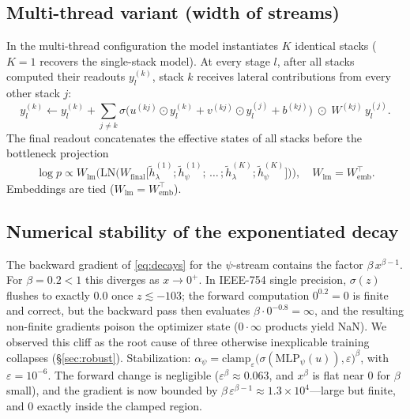 \documentclass[11pt]{article}
\begin{document}
\subsection{Multi-thread variant (width of streams)}\label{sec:threads}
In the multi-thread configuration the model instantiates $K$ identical
stacks ($K=1$ recovers the single-stack model). At every stage $l$, after
all stacks computed their readouts $y_l^{(k)}$, stack $k$ receives lateral
contributions from every other stack $j$:
\begin{equation}\label{eq:lateral}
y_l^{(k)} \leftarrow y_l^{(k)} + \sum_{j \ne k}
\sigma\big(u^{(kj)} \odot y_l^{(k)} + v^{(kj)} \odot y_l^{(j)} + b^{(kj)}\big)
\;\odot\; W^{(kj)}\, y_l^{(j)}.
\end{equation}
The final readout concatenates the effective states of all stacks before the
bottleneck projection
\begin{equation}\label{eq:head}
\log p \propto W_{\mathrm{lm}}\Big( \mathrm{LN}\Big(
W_{\mathrm{final}} \big[ \widetilde h_{\lambda}^{(1)}; \widetilde h_{\psi}^{(1)};
\,\dots\, ; \widetilde h_{\lambda}^{(K)}; \widetilde h_{\psi}^{(K)} \big]
\Big)\Big), \quad W_{\mathrm{lm}} = W_{\mathrm{emb}}^\top.
\end{equation}
Embeddings are tied ($W_{\mathrm{lm}} = W_{\mathrm{emb}}^\top$).

\subsection{Numerical stability of the exponentiated decay}\label{sec:stability}
The backward gradient of \eqref{eq:decays} for the $\psi$-stream contains the
factor $\beta\, x^{\beta-1}$. For $\beta = 0.2 < 1$ this diverges as
$x \to 0^+$. In IEEE-754 single precision, $\sigma(z)$ flushes to exactly
$0.0$ once $z \lesssim -103$; the forward computation $0^{0.2}=0$ is finite
and correct, but the backward pass then evaluates $\beta \cdot 0^{-0.8} =
\infty$, and the resulting non-finite gradients poison the optimizer state
($0\cdot\infty$ products yield NaN). We observed this cliff as the root
cause of three otherwise inexplicable training collapses (\S\ref{sec:robust}).
Stabilization: $\alpha_{\psi} = \mathrm{clamp}_\varepsilon
\big(\sigma(\mathrm{MLP}_\psi(u)), \varepsilon\big)^{\beta}$, with
$\varepsilon = 10^{-6}$. The forward change is negligible
($\varepsilon^{\beta} \approx 0.063$, and $x^{\beta}$ is flat near $0$ for
$\beta$ small), and the gradient is now bounded by
$\beta\,\varepsilon^{\beta-1} \approx 1.3\times10^{4}$---large but finite,
and $0$ exactly inside the clamped region.
\end{document}
